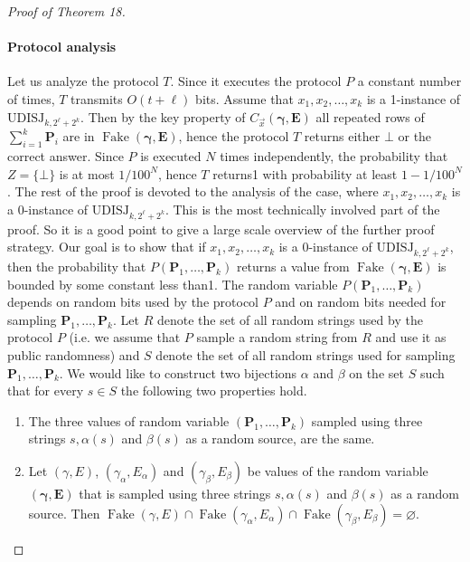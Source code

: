 \begin{proof}[Proof of Theorem 18]
\paragraph{Protocol analysis}
Let us analyze the protocol $T$. Since it executes the protocol $P$ a constant number of times, $T$ transmits $O(t+\ell)$ bits. Assume that $x_1,x_2,\ldots,x_k$ is a 1-instance of $\mathrm{UDISJ}_{k,2^\ell+2^k}$. Then by the key property of $C_{\vec x}(\boldsymbol\gamma,\mathbf E)$ all repeated rows of $\sum_{i=1}^k\mathbf P_i$ are in $\operatorname{Fake}(\boldsymbol\gamma,\mathbf E)$, hence the protocol $T$ returns either $\bot$ or the correct answer. Since $P$ is executed $N$ times independently, the probability that $Z=\{\bot\}$ is at most $1/100^N$, hence $T$ returns1 with probability at least $1-1/100^N$.
The rest of the proof is devoted to the analysis of the case, where $x_1,x_2,\ldots,x_k$ is a 0-instance of $\mathrm{UDISJ}_{k,2^\ell+2^k}$. This is the most technically involved part of the proof. So it is a good point to give a large scale overview of the further proof strategy. Our goal is to show that if $x_1,x_2,\ldots,x_k$ is a 0-instance of $\mathrm{UDISJ}_{k,2^\ell+2^k}$, then the probability that $P(\mathbf P_1,\ldots,\mathbf P_k)$ returns a value from $\operatorname{Fake}(\boldsymbol\gamma,\mathbf E)$ is bounded by some constant less than1.
The random variable $P(\mathbf P_1,\ldots,\mathbf P_k)$ depends on random bits used by the protocol $P$ and on random bits needed for sampling $\mathbf P_1,\ldots,\mathbf P_k$. Let $R$ denote the set of all random strings used by the protocol $P$ (i.e. we assume that $P$ sample a random string from $R$ and use it as public randomness) and $S$ denote the set of all random strings used for sampling $\mathbf P_1,\ldots,\mathbf P_k$. We would like to construct two bijections $\alpha$ and $\beta$ on the set $S$ such that for every $s\in S$ the following two properties hold.
\begin{enumerate}
\item The three values of random variable $(\mathbf P_1,\ldots,\mathbf P_k)$ sampled using three strings $s,\alpha(s)$ and $\beta(s)$ as a random source, are the same.
\item Let $(\gamma,E)$, $(\gamma_\alpha,E_\alpha)$ and $(\gamma_\beta,E_\beta)$ be values of the random variable $(\boldsymbol\gamma,\mathbf E)$ that is sampled using three strings $s,\alpha(s)$ and $\beta(s)$ as a random source. Then $\operatorname{Fake}(\gamma,E)\cap\operatorname{Fake}(\gamma_\alpha,E_\alpha)\cap\operatorname{Fake}(\gamma_\beta,E_\beta)=\varnothing$.

\end{enumerate}
\end{proof}
